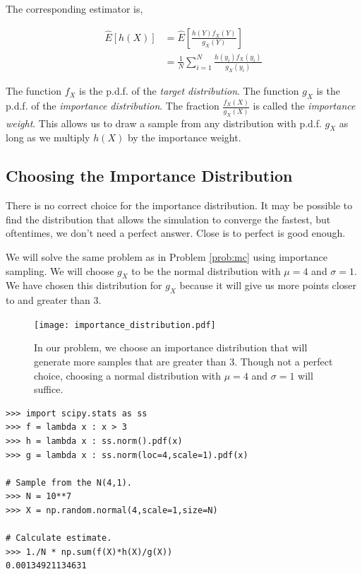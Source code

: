 The corresponding estimator is,

\begin{equation*}
\begin{split}
\widehat{E}[h(X)] & = \widehat{E}\left [ \frac{h(Y)f_X(Y)}{g_X(Y)}\right ] \\
& = \frac{1}{N}\sum_{i = 1}^{N}\frac{h(y_i)f_X(y_i)}{g_X(y_i)}
\end{split}
\end{equation*}

The function $f_X$ is the p.d.f. of the \emph{target distribution}. The function $g_X$ is the p.d.f. of the \emph{importance distribution}. The fraction $\frac{f_X(X)}{g_X(X)}$ is called the \emph{importance weight}. This allows us to draw a sample from any distribution with p.d.f. $g_X$ as long as we multiply $h(X)$ by the importance weight. 

\subsection*{Choosing the Importance Distribution}
There is no correct choice for the importance distribution. It may be possible to find the distribution that allows the simulation to converge the fastest, but oftentimes, we don't need a perfect answer. Close is to perfect is good enough.

We will solve the same problem as in Problem \ref{prob:mc} using importance sampling. We will choose $g_X$ to be the normal distribution with $\mu = 4$ and $\sigma = 1$. 
We have chosen this distribution for $g_X$ because it will give us more points closer to and greater than 3.

\begin{figure}[H]
\texttt{[image: importance\_distribution.pdf]}
\caption{In our problem, we choose an importance distribution that will generate more samples that are greater than 3. Though not a perfect choice, choosing a normal distribution with $\mu = 4$ and $\sigma = 1$ will suffice.}
\label{fig:importance}
\end{figure}

\begin{lstlisting}
>>> import scipy.stats as ss
>>> f = lambda x : x > 3
>>> h = lambda x : ss.norm().pdf(x)
>>> g = lambda x : ss.norm(loc=4,scale=1).pdf(x)

# Sample from the N(4,1).
>>> N = 10**7
>>> X = np.random.normal(4,scale=1,size=N)

# Calculate estimate.
>>> 1./N * np.sum(f(X)*h(X)/g(X))
0.00134921134631
\end{lstlisting}

